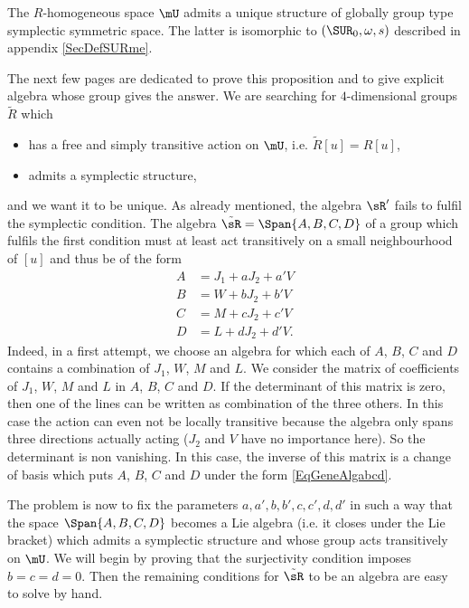 \begin{proposition}
The $R$-homogeneous space $\mU$ admits a unique structure of globally group type symplectic symmetric space. The latter is isomorphic to $(\SUR_0,\omega,s)$ described in appendix \ref{SecDefSURme}.
\label{GT}
\end{proposition}
The next few pages are dedicated to prove this proposition and to give explicit algebra whose group gives the answer. We are searching for $4$-dimensional groups $\tilde R$ which
\begin{itemize} 
\item has a free and simply transitive action on $\mU$, i.e. $\tilde{R}[u]=R[u]$,
\item admits a symplectic structure,
\end{itemize}
and we want it to be unique.  As already mentioned, the algebra $\sR'$ fails to fulfil the symplectic condition. The algebra $\tilde{\sR}=\Span\{ A,B,C,D \}$ of a group which fulfils the first condition must at least act transitively on a small neighbourhood of $[u]$ and thus be of the form
\begin{subequations}  \label{EqGeneAlgabcd}
\begin{align} 
 A&=J_{1}+aJ_{2}+a'V\\
 B&=W+bJ_{2}+b'V\\
 C&=M+cJ_{2}+c'V\\
 D&=L+dJ_{2}+d'V.
\end{align}
\end{subequations}
Indeed, in a first attempt, we choose an algebra for which each of $A$, $B$, $C$ and $D$ contains a combination of $J_{1}$, $W$, $M$ and $L$. We consider the matrix of coefficients of $J_{1}$, $W$, $M$ and $L$ in $A$, $B$, $C$ and $D$. If the determinant of this matrix is zero, then one of the lines can be written as combination of the three others. In this case the action can even not be locally  transitive because the algebra only spans three directions actually acting ($J_{2}$ and $V$ have no importance here). So the determinant is non vanishing. In this case, the inverse of this matrix is a change of basis which puts $A$, $B$, $C$ and $D$ under the form  \eqref{EqGeneAlgabcd}.

The problem is now to fix the parameters $a,a',b,b',c,c',d,d'$ in such a way that the space $\Span\{ A,B,C,D \}$ becomes a Lie algebra (i.e. it closes under the Lie bracket) which admits a symplectic structure and whose group acts transitively on $\mU$. We will begin by proving that the surjectivity condition imposes $b=c=d=0$. Then the remaining conditions for $\tilde \sR$ to be an algebra are easy to solve by hand.

